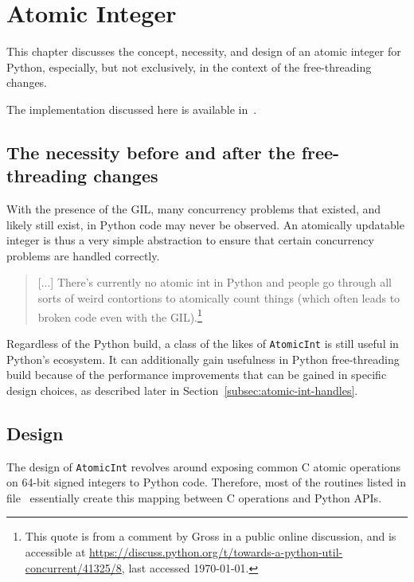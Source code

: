 \chapter{Atomic Integer}\label{ch:atomic-int}

This chapter discusses the concept, necessity, and design of an atomic integer for Python, especially, but not exclusively, in the context of the free-threading changes.

The implementation discussed here is available in~\cite[src/cereggii/atomic\_int]{cereggii}.


\section[The necessity before and after the free-threading changes]{The necessity before and after the free-\\threading changes}\label{sec:the-necessity-before-and-after-the-free-threading-changes}

With the presence of the GIL, many concurrency problems that existed, and likely still exist, in Python code may never be observed.
An atomically updatable integer is thus a very simple abstraction to ensure that certain concurrency problems are handled correctly.

\begin{quote}
    [...] There's currently no atomic int in Python and people go through all sorts of weird contortions to atomically count things (which often leads to broken code even with the GIL).\footnote{%
    This quote is from a comment by Gross in a public online discussion, and is accessible at \url{https://discuss.python.org/t/towards-a-python-util-concurrent/41325/8}, last accessed \today.
}
\end{quote}

Regardless of the Python build, a class of the likes of \texttt{AtomicInt} is still useful in Python's ecosystem.
It can additionally gain usefulness in Python free-threading build because of the performance improvements that can be gained in specific design choices, as described later in Section~\ref{subsec:atomic-int-handles}.


\section{Design}\label{sec:atomic-int-design}

The design of \texttt{AtomicInt} revolves around exposing common C atomic operations on 64-bit signed integers to Python code.
Therefore, most of the routines listed in file~\cite[src/cereggii/atomic\_int/atomic\_int.c]{cereggii} essentially create this mapping between C operations and Python APIs.

